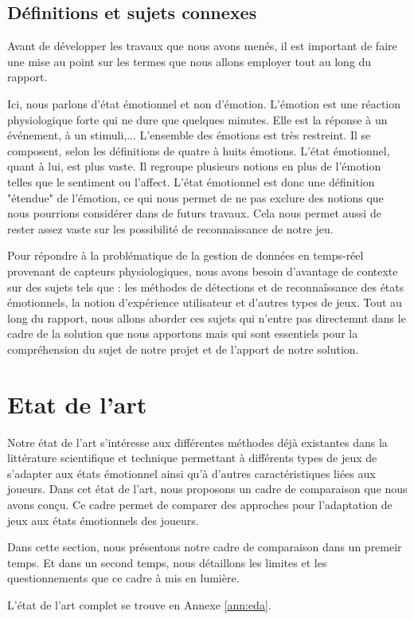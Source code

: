 \documentclass{article}
\begin{document}
	\subsection{Définitions et sujets connexes}\label{sec:connexe}
		Avant de développer les travaux que nous avons menés, il est important de faire une mise au point sur les termes que nous allons employer tout au long du rapport.\par
		Ici, nous parlons d'état émotionnel et non d'émotion.
		L'émotion est une réaction physiologique forte qui ne dure que quelques minutes.
		Elle est la réponse à un événement, à un stimuli,...
		L'ensemble des émotions est très restreint.
		Il se composent, selon les définitions de quatre à huits émotions.
		L'état émotionnel, quant à lui, est plus vaste. 
		Il regroupe plusieurs notions en plus de l'émotion telles que le sentiment ou l'affect. 
		L'état émotionnel est donc une définition "étendue" de l'émotion, ce qui nous permet de ne pas exclure des notions que nous pourrions considérer dans de futurs travaux.
		Cela nous permet aussi de rester assez vaste sur les possibilité de reconnaissance de notre jeu.\par
		Pour répondre à la problématique de la gestion de données en temps-réel provenant de capteurs physiologiques, nous avons besoin d'avantage de contexte sur des sujets tels que : les méthodes de détections et de reconnaîssance des états émotionnels, la notion d'expérience utilisateur et d'autres types de jeux.
		Tout au long du rapport, nous allons aborder ces sujets qui n'entre pas directemnt dans le cadre de la solution que nous apportons mais qui sont essentiels pour la compréhension du sujet de notre projet et de l'apport de notre solution.

\section{Etat de l'art}\label{sec:etatart}
	Notre état de l'art s'intéresse aux différentes méthodes déjà existantes dans la littérature scientifique et technique permettant à différents types de jeux de s'adapter aux états émotionnel ainsi qu'à d'autres caractéristiques liées aux joueurs. 
	Dans cet état de l'art, nous proposons un cadre de comparaison que nous avons conçu.
	Ce cadre permet de comparer des approches pour l'adaptation de jeux aux états émotionnels des joueurs. \par
	Dans cette section, nous présentons notre cadre de comparaison dans un premeir temps. 
	Et dans un second temps, nous détaillons les limites et les questionnements que ce cadre à mis en lumière.\par
	L'état de l'art complet se trouve en Annexe \ref{ann:eda}.
\end{document}
